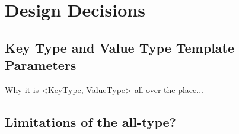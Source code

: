 \chapter{Design Decisions} \label{chap:design}

\section{Key Type and Value Type Template Parameters}
Why it is <KeyType, ValueType> all over the place...

\section{Limitations of the all-type?}
